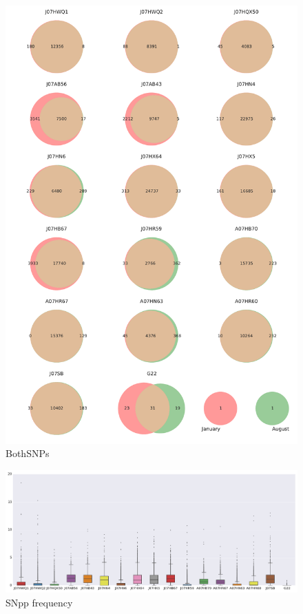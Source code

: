\begin{figure}[!hbtp]
  \centering
  \includegraphics[width=\textwidth]{Chapter5/Figures/Venn_JanAugSNPs.pdf}
  \caption{BothSNPs}
  \label{VennBoth}
\end{figure}

\begin{figure}[!hbtp]
  \centering
  \includegraphics[width=\textwidth]{Chapter5/Figures/SNP_freq_boxplot.pdf}
  \caption{SNpp frequency}
  \label{SNP_boxplot}
\end{figure}


